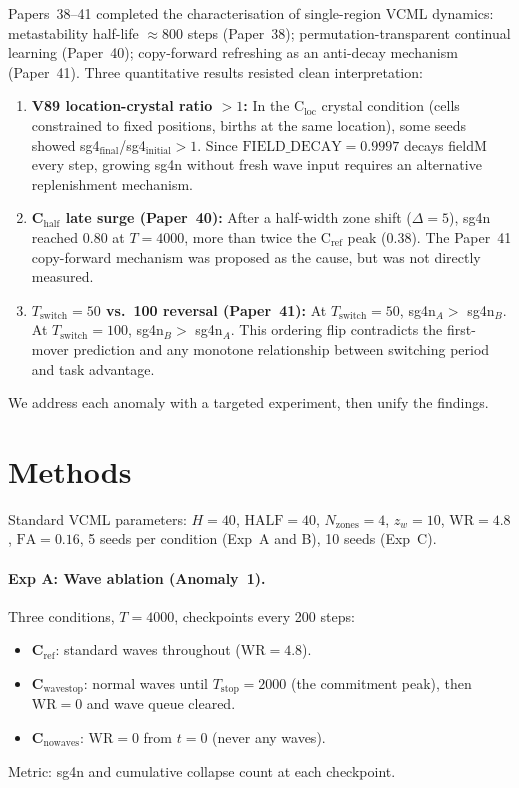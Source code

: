 \documentclass[11pt]{article}
\begin{document}
Papers~38--41 completed the characterisation of single-region VCML dynamics:
metastability half-life $\approx 800$ steps (Paper~38); permutation-transparent
continual learning (Paper~40); copy-forward refreshing as an anti-decay
mechanism (Paper~41).
Three quantitative results resisted clean interpretation:
\begin{enumerate}
  \item \textbf{V89 location-crystal ratio $>1$:}
        In the C$_\mathrm{loc}$ crystal condition (cells constrained to fixed
        positions, births at the same location), some seeds showed
        sg4$_\mathrm{final}$/sg4$_\mathrm{initial} > 1$.
        Since $\mathrm{FIELD\_DECAY}=0.9997$ decays fieldM every step,
        growing sg4n without fresh wave input requires an alternative
        replenishment mechanism.
  \item \textbf{C$_\mathrm{half}$ late surge (Paper~40):}
        After a half-width zone shift ($\Delta=5$), sg4n reached $0.80$ at
        $T=4000$, more than twice the C$_\mathrm{ref}$ peak ($0.38$).
        The Paper~41 copy-forward mechanism was proposed as the cause, but
        was not directly measured.
  \item \textbf{$T_\mathrm{switch}=50$ vs.\ 100 reversal (Paper~41):}
        At $T_\mathrm{switch}=50$, sg4n$_A > $ sg4n$_B$.
        At $T_\mathrm{switch}=100$, sg4n$_B > $ sg4n$_A$.
        This ordering flip contradicts the first-mover prediction and any
        monotone relationship between switching period and task advantage.
\end{enumerate}

We address each anomaly with a targeted experiment, then unify the findings.

\section{Methods}

Standard VCML parameters: $H=40$, $\mathrm{HALF}=40$, $N_\mathrm{zones}=4$,
$z_w=10$, $\mathrm{WR}=4.8$, $\mathrm{FA}=0.16$, 5 seeds per condition
(Exp~A and B), 10 seeds (Exp~C).

\paragraph{Exp A: Wave ablation (Anomaly~1).}
Three conditions, $T=4000$, checkpoints every 200 steps:
\begin{itemize}
  \item \textbf{C$_\mathrm{ref}$}: standard waves throughout ($\mathrm{WR}=4.8$).
  \item \textbf{C$_\mathrm{wavestop}$}: normal waves until $T_\mathrm{stop}=2000$
        (the commitment peak), then $\mathrm{WR}=0$ and wave queue cleared.
  \item \textbf{C$_\mathrm{nowaves}$}: $\mathrm{WR}=0$ from $t=0$ (never any waves).
\end{itemize}
Metric: sg4n and cumulative collapse count at each checkpoint.
\end{document}
